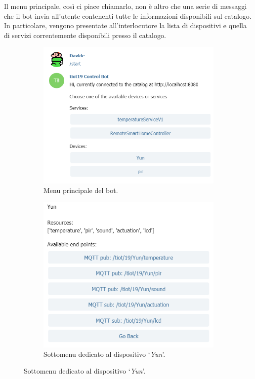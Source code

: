\documentclass[12pt,a4paper]{article}
\begin{document}
\noindent Il menu principale, così ci piace chiamarlo, non è altro che una serie di messaggi che il bot invia all'utente contenenti tutte le informazioni disponibili sul catalogo. In particolare, vengono presentate all'interlocutore la lista di dispositivi e quella di servizi correntemente disponibili presso il catalogo.
\newpage
\begin{figure}
    \centering
    \begin{subfigure}[b]{0.49\textwidth}
        \includegraphics[width=\textwidth]{bot_main_menu.png}
        \caption{Menu principale del bot.}
        \label{fig:bot_main_menu}
    \end{subfigure}
    \begin{subfigure}[b]{0.49\textwidth}
        \includegraphics[width=\textwidth]{bot_yun_submenu.png}
        \caption{Sottomenu dedicato al dispositivo `\textit{Yun}'.}
        \label{fig:bot_yun_submenu}
    \end{subfigure}
\end{figure}
\end{document}
